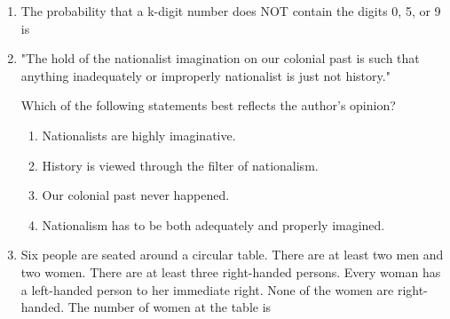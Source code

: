 \documentclass[a4paper, 11pt]{article}
\begin{document}
\begin{enumerate}
    \item The probability that a k-digit number does NOT contain the digits 0, 5, or 9 is
    \begin{enumerate}
    \end{enumerate}
    
    \hfill{}
    
    \item "The hold of the nationalist imagination on our colonial past is such that anything inadequately or improperly nationalist is just not history."
    
    Which of the following statements best reflects the author's opinion?
    \begin{enumerate}
        \item Nationalists are highly imaginative.
        \item History is viewed through the filter of nationalism.
        \item Our colonial past never happened.
        \item Nationalism has to be both adequately and properly imagined.
    \end{enumerate}
    
    \hfill{}

    \item Six people are seated around a circular table. There are at least two men and two women. There are at least three right-handed persons. Every woman has a left-handed person to her immediate right. None of the women are right-handed. The number of women at the table is
    \begin{enumerate}
    \end{enumerate}
    

\end{enumerate}
\end{document}
